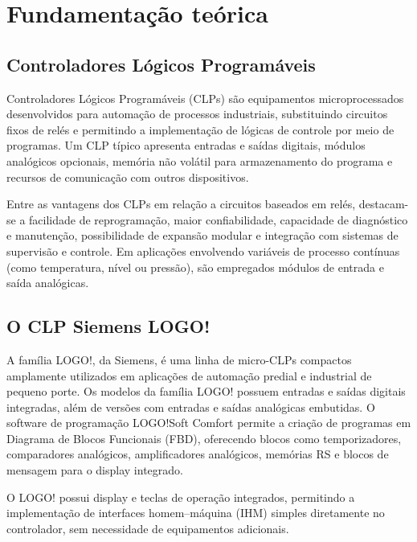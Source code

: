 \documentclass[
  12pt,
  openright,
  oneside,
  a4paper,
  chapter=TITLE,
  section=TITLE,
  brazilian
]{abntex2}
\begin{document}
\chapter{Fundamenta\c{c}\~{a}o te\'{o}rica}

\section{Controladores L\'{o}gicos Program\'{a}veis}

Controladores L\'{o}gicos Program\'{a}veis (CLPs) s\~{a}o equipamentos microprocessados desenvolvidos para automa\c{c}\~{a}o de processos industriais, substituindo circuitos fixos de rel\'{e}s e permitindo a implementa\c{c}\~{a}o de l\'{o}gicas de controle por meio de programas. Um CLP t\'{i}pico apresenta entradas e sa\'{i}das digitais, m\'{o}dulos anal\'{o}gicos opcionais, mem\'{o}ria n\~{a}o vol\'{a}til para armazenamento do programa e recursos de comunica\c{c}\~{a}o com outros dispositivos.

Entre as vantagens dos CLPs em rela\c{c}\~{a}o a circuitos baseados em rel\'{e}s, destacam-se a facilidade de reprograma\c{c}\~{a}o, maior confiabilidade, capacidade de diagn\'{o}stico e manuten\c{c}\~{a}o, possibilidade de expans\~{a}o modular e integra\c{c}\~{a}o com sistemas de supervis\~{a}o e controle. Em aplica\c{c}\~{o}es envolvendo vari\'{a}veis de processo cont\'{i}nuas (como temperatura, n\'{i}vel ou press\~{a}o), s\~{a}o empregados m\'{o}dulos de entrada e sa\'{i}da anal\'{o}gicas.

\section{O CLP Siemens LOGO!}

A fam\'{i}lia LOGO!, da Siemens, \'{e} uma linha de micro-CLPs compactos amplamente utilizados em aplica\c{c}\~{o}es de automa\c{c}\~{a}o predial e industrial de pequeno porte. Os modelos da fam\'{i}lia LOGO! possuem entradas e sa\'{i}das digitais integradas, al\'{e}m de vers\~{o}es com entradas e sa\'{i}das anal\'{o}gicas embutidas. O software de programa\c{c}\~{a}o LOGO!Soft Comfort permite a cria\c{c}\~{a}o de programas em Diagrama de Blocos Funcionais (FBD), oferecendo blocos como temporizadores, comparadores anal\'{o}gicos, amplificadores anal\'{o}gicos, mem\'{o}rias RS e blocos de mensagem para o display integrado.

O LOGO! possui display e teclas de opera\c{c}\~{a}o integrados, permitindo a implementa\c{c}\~{a}o de interfaces homem--m\'{a}quina (IHM) simples diretamente no controlador, sem necessidade de equipamentos adicionais.
\end{document}
